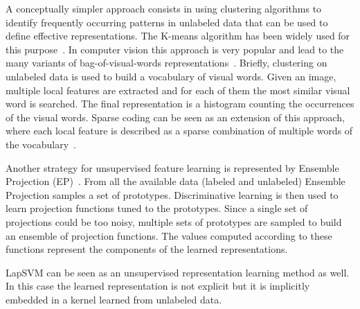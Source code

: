 \documentclass[journal,11pt]{IEEEtran}
\begin{document}
A conceptually simpler approach consists in using clustering
algorithms to identify frequently occurring patterns in unlabeled data
that can be used to define effective representations.  The K-means
algorithm has been widely used for this
purpose~\cite{coates2012learning}.  In computer vision this approach
is very popular and lead to the many variants of bag-of-visual-words
representations~\cite{csurka2004visual,lazebnik2006beyond}.  Briefly,
clustering on unlabeled data is used to build a vocabulary of visual
words.  Given an image, multiple local features are extracted and for
each of them the most similar visual word is searched.  The final
representation is a histogram counting the occurrences of the visual
words.  Sparse coding can be seen as an extension of this approach,
where each local feature is described as a sparse combination of
multiple words of the
vocabulary~\cite{olshausen1997sparse,mairal2010online,lewicki2000learning}.

Another strategy for unsupervised feature learning is represented by
Ensemble Projection (EP)~\cite{dai2013ensemble}. From all the
available data (labeled and unlabeled) Ensemble Projection samples a
set of prototypes. Discriminative learning is then used to learn
projection functions tuned to the prototypes.
Since a single set of projections could be too noisy, multiple sets of
prototypes are sampled to build an ensemble of projection functions. The values computed according to these functions represent the
components of the learned representations.

LapSVM \cite{belkin2006manifold} can be seen as an unsupervised representation learning method as well. In this case the learned representation is not explicit but it is implicitly embedded in a kernel learned from unlabeled data.
\end{document}
